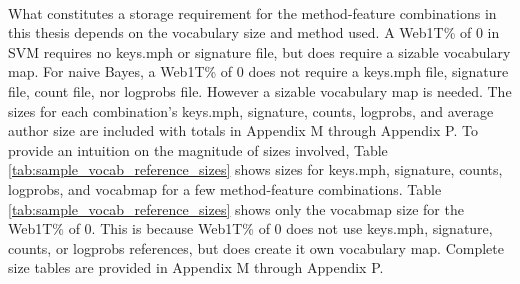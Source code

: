 	\paragraph*{} What constitutes a storage requirement for the method-feature combinations in this thesis depends on the vocabulary size and method used.  A Web1T\% of 0 in SVM requires no keys.mph or signature file, but does require a sizable vocabulary map.  For naive Bayes, a Web1T\% of 0 does not require a keys.mph file, signature file, count file, nor logprobs file.  However a sizable vocabulary map is needed.  The sizes for each combination's keys.mph, signature, counts, logprobs, and average author size are included with totals in Appendix M through Appendix P.  To provide an intuition on the magnitude of sizes involved, Table \ref{tab:sample_vocab_reference_sizes} shows sizes for keys.mph, signature, counts, logprobs, and vocabmap for a few method-feature combinations.  Table \ref{tab:sample_vocab_reference_sizes} shows only the vocabmap size for the Web1T\% of 0.  This is because Web1T\% of 0 does not use keys.mph, signature, counts, or logprobs references, but does create it own vocabulary map.  Complete size tables are provided in Appendix M through Appendix P.
	

